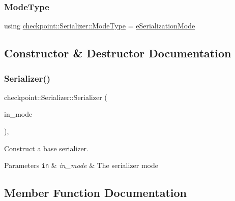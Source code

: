 \subsubsection{\texorpdfstring{Mode\+Type}{ModeType}}
{\footnotesize\ttfamily using \hyperlink{namespacecheckpoint_ae2509499ccd8b1dc48fb535bf8aa3059}{checkpoint\+::\+Serializer\+::\+Mode\+Type} =  \hyperlink{namespacecheckpoint_ae2509499ccd8b1dc48fb535bf8aa3059}{e\+Serialization\+Mode}}



\subsection{Constructor \& Destructor Documentation}
\mbox{\label{structcheckpoint_1_1_serializer_a4007a463384ec96a4c21bd7f049f0be5}} 
\subsubsection{\texorpdfstring{Serializer()}{Serializer()}}
{\footnotesize\ttfamily checkpoint\+::\+Serializer\+::\+Serializer (\begin{DoxyParamCaption}\item[{\hyperlink{namespacecheckpoint_ae2509499ccd8b1dc48fb535bf8aa3059}{Mode\+Type} const \&}]{in\+\_\+mode }\end{DoxyParamCaption})\hspace{0.3cm}{\ttfamily [inline]}, {\ttfamily [explicit]}}



Construct a base serializer. 


\begin{DoxyParams}[1]{Parameters}
\mbox{\tt in}  & {\em in\+\_\+mode} & The serializer mode \\
\hline
\end{DoxyParams}


\subsection{Member Function Documentation}
\mbox{\label{structcheckpoint_1_1_serializer_a52cd27806c3b821605d723900ec7d2e5}} 
